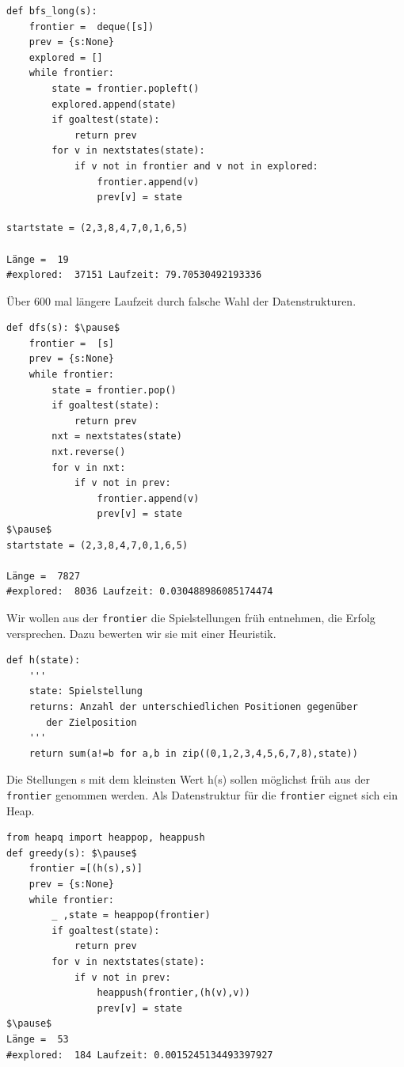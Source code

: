 \begin{frame}[fragile]
\begin{lstlisting} 
def bfs_long(s):
    frontier =  deque([s])
    prev = {s:None}
    explored = []
    while frontier:
        state = frontier.popleft()  
        explored.append(state)
        if goaltest(state):
            return prev
        for v in nextstates(state):
            if v not in frontier and v not in explored:
                frontier.append(v)
                prev[v] = state

startstate = (2,3,8,4,7,0,1,6,5)

Länge =  19
#explored:  37151 Laufzeit: 79.70530492193336
\end{lstlisting} 
Über 600 mal längere Laufzeit durch falsche Wahl der Datenstrukturen.
\end{frame}

\begin{frame}[fragile]
\begin{lstlisting} 
def dfs(s): $\pause$
    frontier =  [s]
    prev = {s:None}
    while frontier:
        state = frontier.pop()  
        if goaltest(state):
            return prev
        nxt = nextstates(state)
        nxt.reverse()
        for v in nxt:
            if v not in prev:
                frontier.append(v)
                prev[v] = state
$\pause$
startstate = (2,3,8,4,7,0,1,6,5)

Länge =  7827
#explored:  8036 Laufzeit: 0.030488986085174474
\end{lstlisting} 

\end{frame}

\begin{frame}[fragile]
Wir wollen aus der \texttt{frontier} die Spielstellungen früh entnehmen, die Erfolg versprechen. Dazu bewerten wir sie mit einer Heuristik. \pause

\begin{lstlisting} 
def h(state): 
    '''
    state: Spielstellung
    returns: Anzahl der unterschiedlichen Positionen gegenüber
       der Zielposition
    '''
    return sum(a!=b for a,b in zip((0,1,2,3,4,5,6,7,8),state)) 
\end{lstlisting} 

Die Stellungen s mit dem kleinsten Wert h(s) sollen möglichst früh aus der \texttt{frontier} genommen werden.
Als Datenstruktur für die \texttt{frontier} eignet sich \pause ein Heap.
\end{frame}

\begin{frame}[fragile]
\begin{lstlisting} 
from heapq import heappop, heappush
def greedy(s): $\pause$
    frontier =[(h(s),s)]  
    prev = {s:None}
    while frontier:
        _ ,state = heappop(frontier)  
        if goaltest(state):
            return prev
        for v in nextstates(state):
            if v not in prev:
                heappush(frontier,(h(v),v))
                prev[v] = state
$\pause$
Länge =  53
#explored:  184 Laufzeit: 0.0015245134493397927
\end{lstlisting} 
\end{frame}

